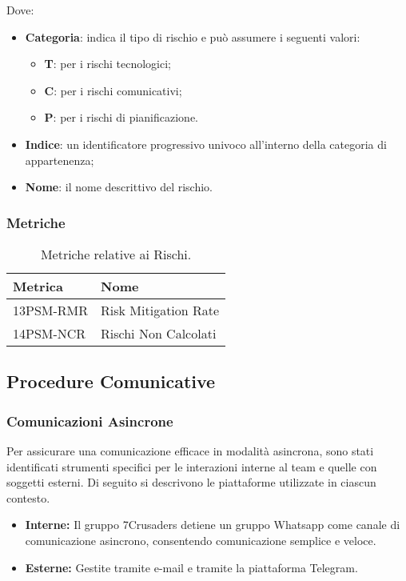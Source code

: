 Dove:
\begin{itemize}
    \item \textbf{Categoria}: indica il tipo di rischio e può assumere i seguenti valori:
    \begin{itemize}
        \item \textbf{T}: per i rischi tecnologici;
        \item \textbf{C}: per i rischi comunicativi;
        \item \textbf{P}: per i rischi di pianificazione.
    \end{itemize}
    \item \textbf{Indice}: un identificatore progressivo univoco all'interno della categoria di appartenenza;
    \item \textbf{Nome}: il nome descrittivo del rischio.
\end{itemize}

\subsubsection{Metriche}
\begin{table}[h!]
    \centering
    \renewcommand{\arraystretch}{1.5}
    \begin{tabular}{|l|l|}
        \hline
        \textbf{Metrica} & \textbf{Nome} \\
        \hline
        13PSM-RMR & Risk Mitigation Rate \\
        \hline
        14PSM-NCR & Rischi Non Calcolati \\
        \hline
    \end{tabular}
    \caption{Metriche relative ai Rischi.}
\end{table}



\subsection{Procedure Comunicative}

\subsubsection{Comunicazioni Asincrone}
Per assicurare una comunicazione efficace in modalità asincrona, sono stati identificati strumenti specifici per le interazioni interne al team e quelle con soggetti esterni. Di seguito si descrivono le piattaforme utilizzate in ciascun contesto.
\begin{itemize}
    \item \textbf{Interne:} Il gruppo 7Crusaders detiene un gruppo Whatsapp come canale di comunicazione asincrono, consentendo comunicazione semplice e veloce.
    \item \textbf{Esterne:} Gestite tramite e-mail e tramite la piattaforma Telegram.
\end{itemize}

